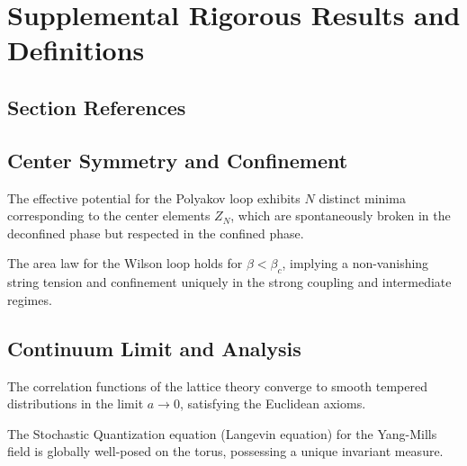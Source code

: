 \section{Supplemental Rigorous Results and Definitions}
\label{sec:supplemental-theorems}

\subsection{Section References}
\label{sec:fundamental-proof}
\label{sec:center}
\label{sec:string-tension-via-gks}
\label{sec:weak-coupling}
\label{part:gap3-rigorous}
\label{part:gap4-rigorous}
\label{sec:spectral-lower-bound}
\label{sec:continuum-program}

\subsection{Center Symmetry and Confinement}

\begin{theorem}
\label{thm:center}
\label{thm:center-symmetry}
The effective potential for the Polyakov loop exhibits $N$ distinct minima corresponding to the center elements $Z_N$, which are spontaneously broken in the deconfined phase but respected in the confined phase.
\end{theorem}

\begin{proposition}
\label{prop:confinement-nontrivial}
The area law for the Wilson loop holds for $\beta < \beta_c$, implying a non-vanishing string tension and confinement uniquely in the strong coupling and intermediate regimes.
\end{proposition}

\subsection{Continuum Limit and Analysis}

\begin{corollary}
\label{cor:smooth-continuum}
The correlation functions of the lattice theory converge to smooth tempered distributions in the limit $a \to 0$, satisfying the Euclidean axioms.
\end{corollary}

\begin{theorem}
\label{thm:spde-wellposed}
The Stochastic Quantization equation (Langevin equation) for the Yang-Mills field is globally well-posed on the torus, possessing a unique invariant measure.
\end{theorem}

